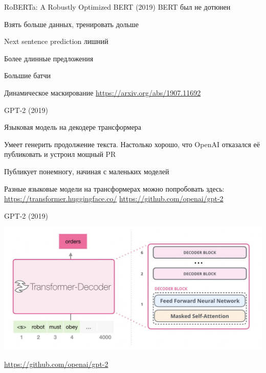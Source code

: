 \documentclass[notes,12pt, aspectratio=169]{beamer}
\newenvironment{wideitemize}{\itemize\addtolength{\itemsep}{10pt}}{\enditemize}
\begin{document}
\begin{frame}{RoBERTa: A Robustly Optimized BERT (2019)}
	\alert{BERT был не дотюнен}

	\begin{wideitemize}
		\item  Взять больше данных, тренировать дольше
		\item Next sentence prediction лишний
		\item Более длинные предложения
		\item Большие батчи
		\item Динамическое маскирование
	\end{wideitemize}
	\vfill
	\footnotesize
	{\color{blue} \url{https://arxiv.org/abs/1907.11692}}
\end{frame}



\begin{frame}{GPT-2 (2019)}
	\begin{wideitemize}
		\item  Языковая модель на декодере трансформера
		\item  Умеет генерить продолжение текста. Настолько хорошо, что OpenAI
		отказался её публиковать и устроил мощный PR
		\item  Публикует понемногу, начиная с маленьких моделей
		\item  Разные языковые модели на трансформерах можно попробовать здесь: \url{
		https://transformer.huggingface.co/}
	\end{wideitemize}
	\vfill
\footnotesize
{\color{blue} \url{https://github.com/openai/gpt-2}}
\end{frame}



\begin{frame}{GPT-2 (2019)}
	\begin{center}
	\includegraphics[width=0.9\linewidth]{masked_att_gpt.png}
\end{center}
	\vfill
	\footnotesize
	{\color{blue} \url{https://github.com/openai/gpt-2}}
\end{frame}
\end{document}
